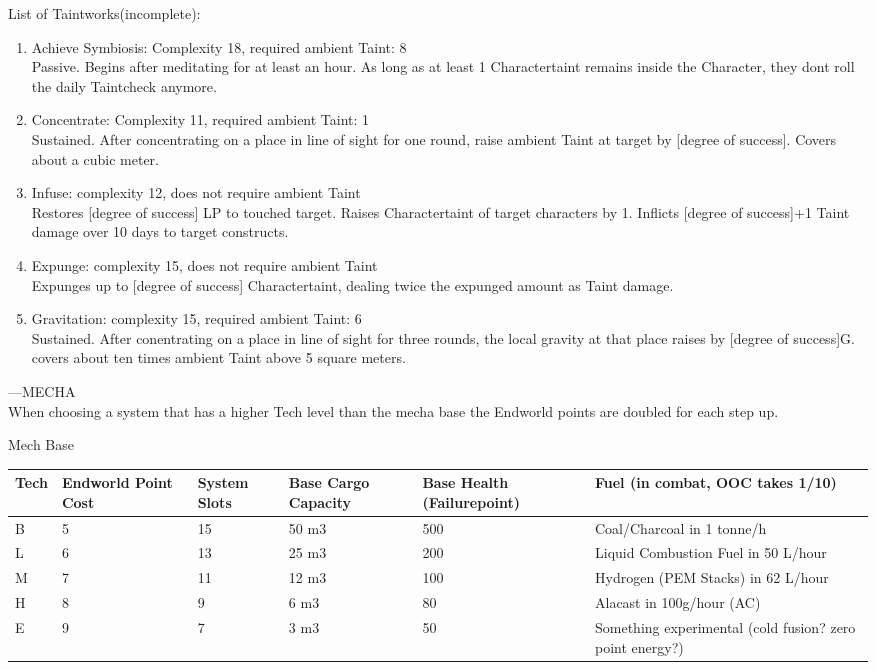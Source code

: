 \documentclass{article}
\begin{document}
List of Taintworks(incomplete):\\
\begin{enumerate}[label= - ]
\item Achieve Symbiosis: Complexity 18, required ambient Taint: 8\\
Passive. Begins after meditating for at least an hour. As long as at least 1 Charactertaint remains inside the Character,
they dont roll the daily Taintcheck anymore.\\

\item Concentrate: Complexity 11, required ambient Taint: 1\\
Sustained. After concentrating on a place in line of sight for one round, raise ambient Taint at target by [degree of success].
Covers about a cubic meter.

\item Infuse: complexity 12, does not require ambient Taint\\
Restores [degree of success] LP to touched target. Raises Charactertaint of target characters by 1.
Inflicts [degree of success]+1 Taint damage over 10 days to target constructs.

\item Expunge: complexity 15, does not require ambient Taint\\
Expunges up to [degree of success] Charactertaint, dealing twice the expunged amount as Taint damage.

\item Gravitation: complexity 15, required ambient Taint: 6\\
Sustained. After conentrating on a place in line of sight for three rounds, the local gravity at that place raises by
[degree of success]G. covers about ten times ambient Taint above 5 square meters.

\end{enumerate}


---MECHA\\

When choosing a system that has a higher Tech level than the mecha base the Endworld points are doubled for each step up.

Mech Base\\
\begin{tabularx}{17cm}{m{0.7cm}|m{1.4cm}|m{1cm}|m{1.4cm}|m{1.4cm}|l}
	Tech	& Endworld Point Cost	& System Slots	& Base Cargo Capacity	& Base Health (Failurepoint) 	& 	Fuel (in combat, OOC takes 1/10)\\
\hline B & 	5		& 	15	&	50 m3		& 	500		 	& Coal/Charcoal in 1 tonne/h\\
	L	& 	6		& 	13	&	25 m3		& 	200			& Liquid Combustion Fuel in 50 L/hour\\
	M	&	7		& 	11	&	12 m3		&	100			& Hydrogen (PEM Stacks)	in 62 L/hour \\
	H	& 	8		&	9	&	 6 m3 		& 	 80			& Alacast in 100g/hour  (AC)\\
	E	& 	9		& 	7	&	 3 m3		&	 50			& Something experimental (cold fusion? zero point energy?)\\
\end{tabularx}\\\\\\
\end{document}
